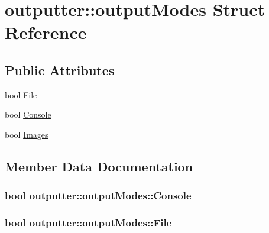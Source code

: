 \hypertarget{structoutputter_1_1output_modes}{}\section{outputter\+:\+:output\+Modes Struct Reference}
\label{structoutputter_1_1output_modes}
\subsection*{Public Attributes}
\begin{DoxyCompactItemize}
\item 
bool \hyperlink{structoutputter_1_1output_modes_ad15be616f241db4682a34fe26f893958}{File}
\item 
bool \hyperlink{structoutputter_1_1output_modes_ab0854df188fd778df459dbc17b9fe688}{Console}
\item 
bool \hyperlink{structoutputter_1_1output_modes_a94bd7bdd78652c810d530372b124665d}{Images}
\end{DoxyCompactItemize}


\subsection{Member Data Documentation}
\subsubsection[{\texorpdfstring{Console}{Console}}]{\setlength{\rightskip}{0pt plus 5cm}bool outputter\+::output\+Modes\+::\+Console}\hypertarget{structoutputter_1_1output_modes_ab0854df188fd778df459dbc17b9fe688}{}\label{structoutputter_1_1output_modes_ab0854df188fd778df459dbc17b9fe688}
\subsubsection[{\texorpdfstring{File}{File}}]{\setlength{\rightskip}{0pt plus 5cm}bool outputter\+::output\+Modes\+::\+File}\hypertarget{structoutputter_1_1output_modes_ad15be616f241db4682a34fe26f893958}{}\label{structoutputter_1_1output_modes_ad15be616f241db4682a34fe26f893958}

